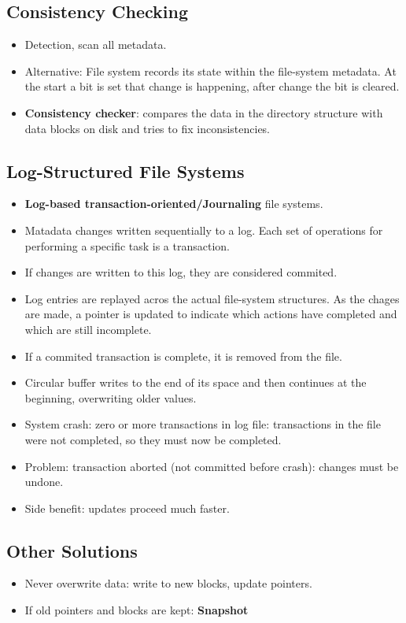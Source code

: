 \documentclass[10pt]{report}
\begin{document}
		\subsection{Consistency Checking}
			\begin{itemize}
				\item Detection, scan all metadata.
				\item Alternative: File system records its state within the file-system metadata. At the start a bit is set that change is happening, after change the bit is cleared.
				\item \textbf{Consistency checker}: compares the data in the directory structure with data blocks on disk and tries to fix inconsistencies.
			\end{itemize}

		\subsection{Log-Structured File Systems}
			\begin{itemize}
				\item \textbf{Log-based transaction-oriented/Journaling} file systems.
				\item Matadata changes written sequentially to a log. Each set of operations for performing a specific task is a transaction.
				\item If changes are written to this log, they are considered commited.
				\item Log entries are replayed acros the actual file-system structures. As the chages are made, a pointer is updated to indicate which actions have completed and which are still incomplete.
				\item If a commited transaction is complete, it is removed from the file.
				\item Circular buffer writes to the end of its space and then continues at the beginning, overwriting older values.
				\item System crash: zero or more transactions in log file: transactions in the file were not completed, so they must now be completed.
				\item Problem: transaction aborted (not committed before crash): changes must be undone.
				\item Side benefit: updates proceed much faster.
			\end{itemize}

		\subsection{Other Solutions}
			\begin{itemize}
				\item Never overwrite data: write to new blocks, update pointers.
				\item If old pointers and blocks are kept: \textbf{Snapshot}
			\end{itemize}
\end{document}
